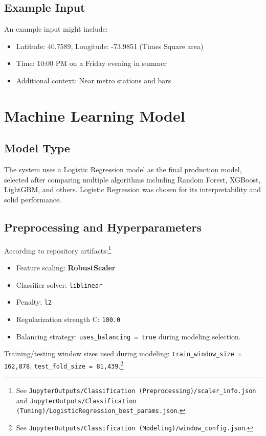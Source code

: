 \documentclass{article}
\begin{document}
\subsection{Example Input}
An example input might include:
\begin{itemize}
\item Latitude: 40.7589, Longitude: -73.9851 (Times Square area)
\item Time: 10:00 PM on a Friday evening in summer
\item Additional context: Near metro stations and bars
\end{itemize}

\section{Machine Learning Model}

\subsection{Model Type}
The system uses a Logistic Regression model as the final production model, selected after comparing multiple algorithms including Random Forest, XGBoost, LightGBM, and others. Logistic Regression was chosen for its interpretability and solid performance.

\subsection{Preprocessing and Hyperparameters}
According to repository artifacts:\footnote{See \texttt{JupyterOutputs/Classification (Preprocessing)/scaler\_info.json} and \texttt{JupyterOutputs/Classification (Tuning)/LogisticRegression\_best\_params.json}.}
\begin{itemize}
	\item Feature scaling: \textbf{RobustScaler}
	\item Classifier solver: \texttt{liblinear}
	\item Penalty: \texttt{l2}
	\item Regularization strength C: \texttt{100.0}
	\item Balancing strategy: \texttt{uses\_balancing = true} during modeling selection.
\end{itemize}

Training/testing window sizes used during modeling: \texttt{train\_window\_size = 162{,}878}, \texttt{test\_fold\_size = 81{,}439}.\footnote{See \texttt{JupyterOutputs/Classification (Modeling)/window\_config.json}.}
\end{document}
